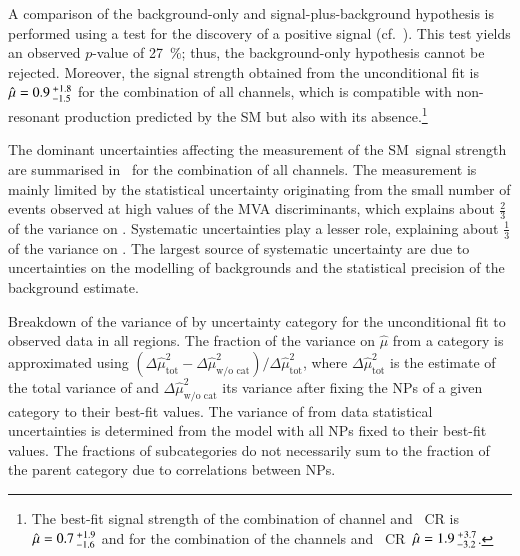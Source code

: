 A comparison of the background-only and signal-plus-background hypothesis is
performed using a test for the discovery of a positive signal
(cf.~). This test yields an observed $p$-value of
\SI{27}{\percent}; thus, the background-only hypothesis cannot be rejected.
Moreover, the signal strength obtained from the unconditional fit is
$\hat{\mu} = 0.9\,^{\hspace{0.25pt}+\hspace{0.25pt}1.8}_{-1.5}$ for the
combination of all channels, which is compatible with non-resonant \HH
production predicted by the SM but also with its absence.\footnote{The best-fit
  signal strength of the combination of \hadhad channel and \ZHF~CR
  is~$\hat{\mu} = 0.7\,^{\hspace{0.25pt}+\hspace{0.25pt}1.9}_{-1.6}$ and for the
  combination of the \lephad channels and
  \ZHF~CR~$\hat{\mu} = 1.9\,^{\hspace{0.25pt}+\hspace{0.25pt}3.7}_{-3.2}$.}

The dominant uncertainties affecting the measurement of the SM~\HH signal
strength are summarised in~ for the combination of
all channels. The measurement is mainly limited by the statistical uncertainty
originating from the small number of events observed at high values of the MVA
discriminants, which explains about $\frac{2}{3}$ of the variance on
\muhat. Systematic uncertainties play a lesser role, explaining about
$\frac{1}{3}$ of the variance on \muhat. The largest source of systematic
uncertainty are due to uncertainties on the modelling of backgrounds and the
statistical precision of the background estimate.

\begin{table}[htbp]
  \centering

  \caption[Breakdown of the variance of \muhat by uncertainty category for the
  SM~\HH search.]{Breakdown of the variance of \muhat by uncertainty category
    for the unconditional fit to observed data in all regions. The fraction of
    the variance on $\hat{\mu}$ from a category is approximated using
    $(\Delta\hat{\mu}^2_{\text{tot}} - \Delta\hat{\mu}^2_{\text{w/o cat}}) /
    \Delta \hat{\mu}^2_{\text{tot}}$, where $\Delta\hat{\mu}^2_{\text{tot}}$ is
    the estimate of the total variance of \muhat and
    $\Delta\hat{\mu}^2_{\text{w/o cat}}$ its variance after fixing the NPs of a
    given category to their best-fit values. The variance of \muhat from data
    statistical uncertainties is determined from the model with all NPs fixed to
    their best-fit values. The fractions of subcategories do not necessarily sum
    to the fraction of the parent category due to correlations between NPs.}%
  \label{tab:breakdown_nonres}

  
\end{table}

